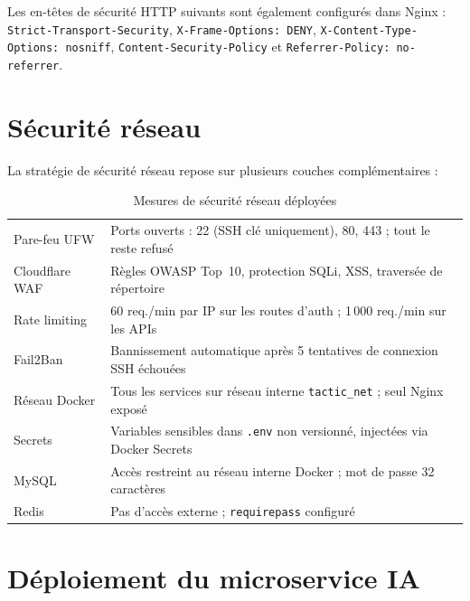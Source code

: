 Les en-têtes de sécurité HTTP suivants sont également configurés dans Nginx :
\texttt{Strict-Transport-Security}, \texttt{X-Frame-Options: DENY},
\texttt{X-Content-Type-Options: nosniff}, \texttt{Content-Security-Policy}
et \texttt{Referrer-Policy: no-referrer}.

\section{Sécurité réseau}

La stratégie de sécurité réseau repose sur plusieurs couches complémentaires :

\begin{table}[H]
  \centering
  \caption{Mesures de sécurité réseau déployées}
  \label{tab:securite_reseau}
  \begin{tabularx}{\textwidth}{L{4cm}X}
    \toprule
     &  \\
    \midrule
    Pare-feu UFW     & Ports ouverts : 22 (SSH clé uniquement), 80, 443 ; tout le reste refusé \\
    Cloudflare WAF   & Règles OWASP Top~10, protection SQLi, XSS, traversée de répertoire \\
    Rate limiting    & 60 req./min par IP sur les routes d'auth ; 1\,000 req./min sur les APIs \\
    Fail2Ban         & Bannissement automatique après 5 tentatives de connexion SSH échouées \\
    Réseau Docker    & Tous les services sur réseau interne \texttt{tactic\_net} ; seul Nginx exposé \\
    Secrets          & Variables sensibles dans \texttt{.env} non versionné, injectées via Docker Secrets \\
    MySQL            & Accès restreint au réseau interne Docker ; mot de passe 32 caractères \\
    Redis            & Pas d'accès externe ; \texttt{requirepass} configuré \\
    \bottomrule
  \end{tabularx}
\end{table}

\section{Déploiement du microservice IA}

